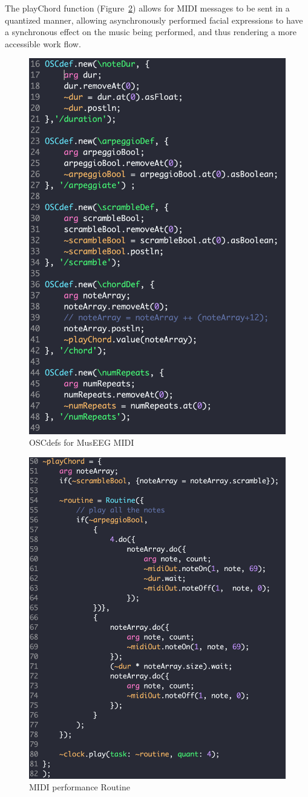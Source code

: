 The playChord function (Figure~\ref{fig:playchord}) allows for MIDI messages to be sent in a quantized manner, allowing asynchronously performed facial expressions to have a synchronous effect on the music being performed, and thus rendering a more accessible work flow. 

\begin{figure}[h!]
	\centering
		\includegraphics[width=0.5\columnwidth]{midi-oscdefs.png}
	\caption{OSCdefs for MusEEG MIDI}
	\label{fig:midi-oscdefs}
\end{figure}

\begin{figure}[h!]
	\centering
		\includegraphics[width=1\columnwidth]{playchord.png}
	\caption{MIDI performance Routine}
	\label{fig:playchord}
\end{figure}

